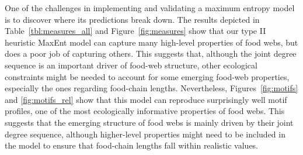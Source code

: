 
One of the challenges in implementing and validating a maximum entropy model is
to discover where its predictions break down. The results depicted in
Table~\ref{tbl:measures_all} and Figure~\ref{fig:measures} show that our type II heuristic
MaxEnt model can capture many high-level properties of food webs, but does a
poor job of capturing others. This suggests that, although the joint degree
sequence is an important driver of food-web structure, other ecological
constraints might be needed to account for some emerging food-web properties,
especially the ones regarding food-chain lengths. Nevertheless,
Figures~\ref{fig:motifs} and \ref{fig:motifs_rel} show that this model can reproduce
surprisingly well motif profiles, one of the most ecologically informative
properties of food webs. This suggests that the emerging structure of food webs
is mainly driven by their joint degree sequence, although higher-level
properties might need to be included in the model to ensure that food-chain
lengths fall within realistic values. 


